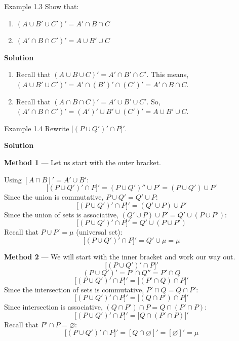 \begin{example}{Example 1.3}
Show that:
\begin{enumerate}
  \item[a.] $(A \cup B' \cup C')' = A' \cap B \cap C$
  \item[b.] $(A' \cap B \cap C')' = A \cup B' \cup C$
\end{enumerate}

\medskip\noindent\textbf{Solution}
\begin{enumerate}
  \item[a.] Recall that $(A \cup B \cup C)' = A' \cap B' \cap C'$.
  This means, $(A \cup B' \cup C')' = A' \cap (B')' \cap (C')' = A' \cap B \cap C$.

  \item[b.] Recall that $(A \cap B \cap C)' = A' \cup B' \cup C'$.
  So, $(A' \cap B \cap C')' = (A')' \cup B' \cup (C')' = A \cup B' \cup C$.
\end{enumerate}
\end{example}

\begin{example}{Example 1.4}
Rewrite $\big[(P \cup Q')' \cap P\big]'$.

\medskip\noindent\textbf{Solution}

\textbf{Method 1} --- Let us start with the outer bracket.

Using $[A \cap B]' = A' \cup B'$:
\[
  \big[(P \cup Q')' \cap P\big]' = (P \cup Q')'' \cup P' = (P \cup Q') \cup P'
\]
Since the union is commutative, $P \cup Q' = Q' \cup P$:
\[
  \big[(P \cup Q')' \cap P\big]' = (Q' \cup P) \cup P'
\]
Since the union of sets is associative, $(Q' \cup P) \cup P' = Q' \cup (P \cup P')$:
\[
  \big[(P \cup Q')' \cap P\big]' = Q' \cup (P \cup P')
\]
Recall that $P \cup P' = \mu$ (universal set):
\[
  \big[(P \cup Q')' \cap P\big]' = Q' \cup \mu = \mu
\]

\textbf{Method 2} --- We will start with the inner bracket and work our way out.
\[
  \big[(P \cup Q')' \cap P\big]'
\]
\[
  (P \cup Q')' = P' \cap Q'' = P' \cap Q
\]
\[
  \big[(P \cup Q')' \cap P\big]' = \big[(P' \cap Q) \cap P\big]'
\]
Since the intersection of sets is commutative, $P' \cap Q = Q \cap P'$:
\[
  \big[(P \cup Q')' \cap P\big]' = \big[(Q \cap P') \cap P\big]'
\]
Since intersection is associative, $(Q \cap P') \cap P = Q \cap (P' \cap P)$:
\[
  \big[(P \cup Q')' \cap P\big]' = \big[Q \cap (P' \cap P)\big]'
\]
Recall that $P' \cap P = \varnothing$:
\[
  \big[(P \cup Q')' \cap P\big]' = [Q \cap \varnothing]' = [\varnothing]' = \mu
\]
\end{example}

